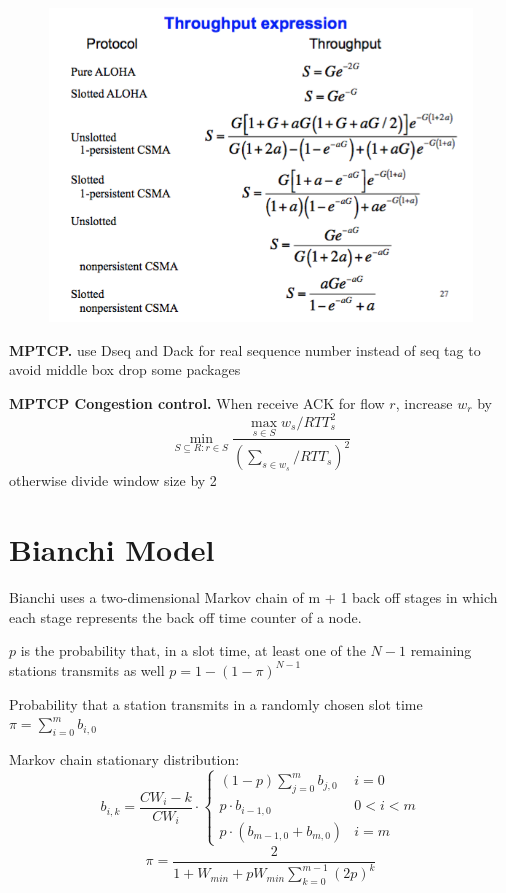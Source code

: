 \documentclass[10pt,twocolumn]{article}
\renewcommand{\l}{\left}
\renewcommand{\r}{\right}
\renewcommand{\bf}{\textbf}
\begin{document}
\begin{figure}
  \centering
  \includegraphics[width=0.8\linewidth]{figures/throughput.png}
\end{figure}

\bf{MPTCP.} use Dseq and Dack for real sequence number instead of seq tag to avoid middle box drop some packages

\bf{MPTCP Congestion control.} When receive ACK for flow $r$, increase $w_r$ by
\[
  \min_{S\subseteq R: r\in S} \frac{\max_{s\in S}w_s / RTT_s^2}{\l( \sum_{s\in w_s}/ RTT_s \r)^2}
\]
otherwise divide window size by 2

\section{Bianchi Model}


Bianchi uses a two-dimensional Markov chain of m + 1 back off stages in which each stage represents the back off time counter of a node.

$p$ is the probability that, in a slot time, at least one of the $N-1$ remaining stations transmits as well $p=1-(1-\pi)^{N-1}$

Probability that a station transmits in a randomly chosen slot time $\pi = \sum_{i=0}^m b_{i,0}$

Markov chain stationary distribution:
\[
  b_{i,k} = \frac{CW_i - k}{CW_i} \cdot \begin{cases}
    (1-p) \sum_{j=0}^m b_{j,0} & i = 0\\
    p \cdot b_{i-1,0} & 0 < i < m \\
    p\cdot(b_{m-1,0}+b_{m,0}) & i = m
  \end{cases}
\]
\[
  \pi = \frac 2 {1+W_{min} + p W_{min} \sum_{k=0}^{m-1}(2p)^k}
\]
\end{document}
